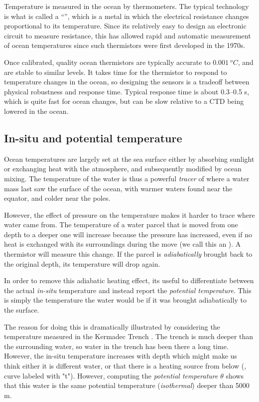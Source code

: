 Temperature is measured in the ocean by thermometers.  The typical technology is what is called a ``'', which is a metal in which the electrical resistance changes proportional to its temperature.  Since its relatively easy to design an electronic circuit to measure resistance, this has allowed rapid and automatic measurement of ocean temperatures since such thermistors were first developed in the 1970s.  

Once calibrated, quality ocean thermistors are typically accurate to $0.001\ ^oC$, and are stable to similar levels. It takes time for the thermistor to respond to temperature changes in the ocean, so designing the sensors is a tradeoff between physical robustness and response time.  Typical response time is about 0.3--0.5 s, which is quite fast for ocean changes, but can be slow relative to a CTD being lowered in the ocean. 

\subsection{In-situ and potential temperature}
\label{sec:potential-temperature}

Ocean temperatures are largely set at the sea surface either by absorbing sunlight or exchanging heat with the atmosphere, and subsequently modified by ocean mixing.  The temperature of the water is thus a powerful \emph{tracer} of where a water mass last saw the surface of the ocean, with warmer waters found near the equator, and colder near the poles.    


However, the effect of pressure on the temperature makes it harder to trace where water came from.  The temperature of a water parcel that is moved from one depth to a deeper one will increase because the pressure has increased, even if no heat is exchanged with its surroundings during the move (we call this an \emph{}).  A thermistor will measure this change. If the parcel is \emph{adiabatically} brought back to the original depth, its temperature will drop again.  

In order to remove this adiabatic heating effect, its useful to differentiate between the actual \emph{in-situ} temperature and instead report the \emph{potential temperature}.  This is simply the temperature the water would be if it was brought adiabatically to the surface.  

The reason for doing this is dramatically illustrated by considering the temperature measured in the Kermadec Trench \citep{Warren73}.  The trench is much deeper than the surrounding water, so water in the trench has been there a long time.  However, the in-situ temperature increases with depth which might make us think either it is different water, or that there is a heating source from below (, curve labeled with "t").  However, computing the \emph{potential temperature} $\theta$ shows that this water is the same potential temperature (\emph{isothermal}) deeper than 5000 m.   

